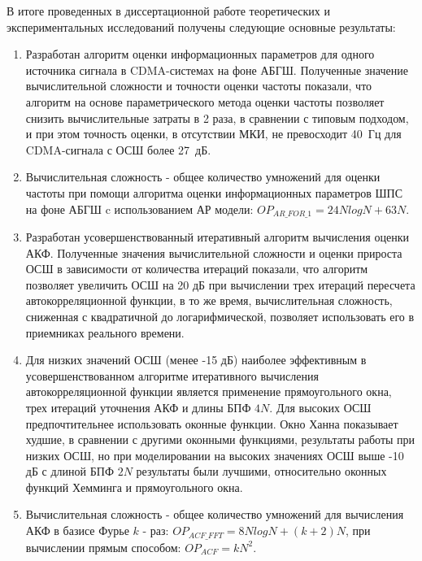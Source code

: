 В итоге проведенных в диссертационной работе теоретических и экспериментальных исследований получены следующие основные результаты:
\begin{enumerate}
	\item {Разработан алгоритм оценки информационных параметров для одного источника сигнала в CDMA-системах на фоне АБГШ.
		Полученные значение вычислительной сложности и точности оценки частоты показали, что алгоритм на основе параметрического метода
		оценки частоты позволяет снизить вычислительные затраты в 2 раза, в сравнении с типовым подходом, и при этом точность оценки, в отсутствии МКИ,
		не превосходит \mbox{40 Гц} для CDMA-сигнала с ОСШ более \mbox{27 дБ.}}

	\item Вычислительная сложность - общее количество умножений для оценки частоты при помощи алгоритма оценки информационных параметров ШПС на фоне АБГШ c использованием АР модели:
		${OP_{AR\_FOR\_1} = 24NlogN + 63N}$.	

	\item {Разработан усовершенствованный итеративный алгоритм вычисления оценки АКФ. Полученные значения вычислительной сложности и оценки прироста ОСШ в зависимости
		от количества итераций показали, что алгоритм позволяет увеличить ОСШ на 20 дБ при вычислении трех итераций пересчета автокорреляционной функции, в то
		же время, вычислительная сложность, сниженная с квадратичной до логарифмической, позволяет использовать его в приемниках реального времени.}
	
	\item Для низких значений ОСШ (менее -15 дБ) наиболее эффективным в усовершенствованном алгоритме итеративного вычисления автокорреляционной функции
		является применение прямоугольного окна, трех итераций уточнения АКФ и длины БПФ ${4N}$.
		Для высоких ОСШ предпочтительнее использовать оконные функции. Окно Ханна показывает худшие, в сравнении с другими оконными функциями,
		результаты работы при низких ОСШ, но при моделировании на высоких значениях ОСШ выше -10 дБ с длиной БПФ ${2N}$ результаты были лучшими,
		относительно оконных функций Хемминга и прямоугольного окна.

	\item Вычислительная сложность - общее количество умножений для вычисления АКФ в базисе Фурье ${k}$ - раз: ${OP_{ACF\_FFT}=8NlogN + (k+2)N}$, при вычислении
		прямым способом: ${OP_{ACF}=kN^2}$.


\end{enumerate}
